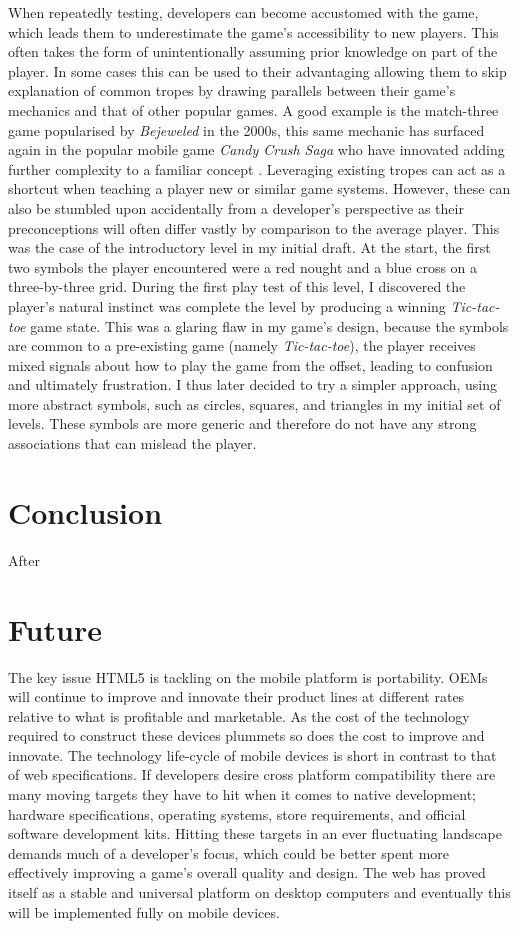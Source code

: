 \documentclass[final]{cmpreport}
\begin{document}
When repeatedly testing, developers can become accustomed with the game, which leads them to underestimate the game's accessibility to new players. This often takes the form of unintentionally assuming prior knowledge on part of the player. In some cases this can be used to their advantaging allowing them to skip explanation of common tropes by drawing parallels between their game's mechanics and that of other popular games. A good example is the match-three game popularised by \textit{Bejeweled} in the 2000s, this same mechanic has surfaced again in the popular mobile game \textit{Candy Crush Saga} who have innovated adding further complexity to a familiar concept \citep{Juul}. Leveraging existing tropes can act as a shortcut when teaching a player new or similar game systems. However, these can also be stumbled upon accidentally from a developer's perspective as their preconceptions will often differ vastly by comparison to the average player. This was the case of the introductory level in my initial draft. At the start, the first two symbols the player encountered were a red nought and a blue cross on a three-by-three grid. During the first play test of this level, I discovered the player's natural instinct was complete the level by producing a winning \emph{Tic-tac-toe} game state. This was a glaring flaw in my game's design, because the symbols are common to a pre-existing game (namely \emph{Tic-tac-toe}), the player receives mixed signals about how to play the game from the offset, leading to confusion and ultimately frustration. I thus later decided to try a simpler approach, using more abstract symbols, such as circles, squares, and triangles in my initial set of levels. These symbols are more generic and therefore do not have any strong associations that can mislead the player.

\section{Conclusion}
After

\section{Future}
The key issue HTML5 is tackling on the mobile platform is portability. OEMs will continue to improve and innovate their product lines at different rates relative to what is profitable and marketable. As the cost of the technology required to construct these devices plummets so does the cost to improve and innovate. The technology life-cycle of mobile devices is short in contrast to that of web specifications. If developers desire cross platform compatibility there are many moving targets they have to hit when it comes to native development; hardware specifications, operating systems, store requirements, and official software development kits. Hitting these targets in an ever fluctuating landscape demands much of a developer's focus, which could be better spent more effectively improving a game's overall quality and design. The web has proved itself as a stable and universal platform on desktop computers and eventually this will be implemented fully on mobile devices.
\end{document}
